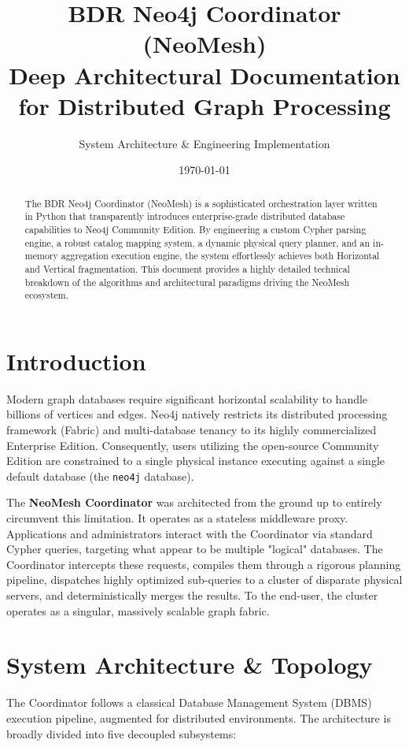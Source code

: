 \documentclass{article}
\title{\textbf{BDR Neo4j Coordinator (NeoMesh)}\\\Large{Deep Architectural Documentation for Distributed Graph Processing}}
\author{System Architecture \& Engineering Implementation}
\date{\today}
\begin{document}
\maketitle

\begin{abstract}
The BDR Neo4j Coordinator (NeoMesh) is a sophisticated orchestration layer written in Python that transparently introduces enterprise-grade distributed database capabilities to Neo4j Community Edition. By engineering a custom Cypher parsing engine, a robust catalog mapping system, a dynamic physical query planner, and an in-memory aggregation execution engine, the system effortlessly achieves both Horizontal and Vertical fragmentation. This document provides a highly detailed technical breakdown of the algorithms and architectural paradigms driving the NeoMesh ecosystem.
\end{abstract}

\tableofcontents
\vspace{1cm}

\section{Introduction}
Modern graph databases require significant horizontal scalability to handle billions of vertices and edges. Neo4j natively restricts its distributed processing framework (Fabric) and multi-database tenancy to its highly commercialized Enterprise Edition. Consequently, users utilizing the open-source Community Edition are constrained to a single physical instance executing against a single default database (the \texttt{neo4j} database). 

The \textbf{NeoMesh Coordinator} was architected from the ground up to entirely circumvent this limitation. It operates as a stateless middleware proxy. Applications and administrators interact with the Coordinator via standard Cypher queries, targeting what appear to be multiple "logical" databases. The Coordinator intercepts these requests, compiles them through a rigorous planning pipeline, dispatches highly optimized sub-queries to a cluster of disparate physical servers, and deterministically merges the results. To the end-user, the cluster operates as a singular, massively scalable graph fabric.

\section{System Architecture \& Topology}
The Coordinator follows a classical Database Management System (DBMS) execution pipeline, augmented for distributed environments. The architecture is broadly divided into five decoupled subsystems:
\end{document}
